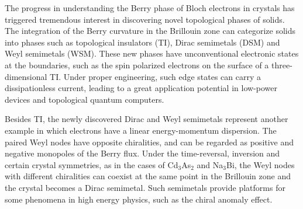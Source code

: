 %
%
%
%
%
%
%

The progress in understanding the Berry phase of Bloch electrons in crystals has triggered tremendous interest in discovering novel topological phases of solids. The integration of the Berry curvature in the Brillouin zone can categorize solids into phases such as topological insulators (TI), Dirac semimetals (DSM) and Weyl semimetals (WSM). These new phases have unconventional electronic states at the boundaries, such as the spin polarized electrons on the surface of a three-dimensional TI. Under proper engineering, such edge states can carry a dissipationless current, leading to a great application potential in low-power devices and topological quantum computers.

Besides TI, the newly discovered Dirac and Weyl semimetals represent another example in which electrons have a linear energy-momentum dispersion. The paired Weyl nodes have opposite chiralities, and can be regarded as positive and negative monopoles of the Berry flux. Under the time-reversal, inversion and certain crystal symmetries, as in the cases of Cd$_3$As$_2$ and Na$_3$Bi, the Weyl nodes with different chiralities can coexist at the same point in the Brillouin zone and the crystal becomes a Dirac semimetal. Such semimetals provide platforms for some phenomena in high energy physics, such as the chiral anomaly effect.

